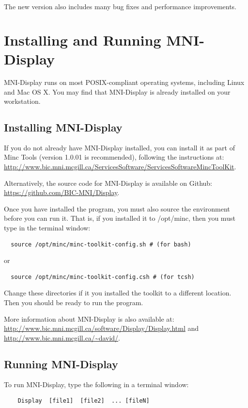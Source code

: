\documentclass[11pt,letterpaper]{article}
\newcommand{\display}{\mbox{MNI-Display}}
\begin{document}
The new version also includes many bug fixes and performance improvements.

\section{Installing and Running \display{}}

\display{} runs on most POSIX-compliant operating systems, including Linux
and Mac OS X. You may find that \display{} is already installed on your workstation.

\subsection{Installing \display{}}
If you do not already have \display{} installed, you can install it as
part of Minc Tools (version 1.0.01 is recommended), following the
instructions at:
\url{http://www.bic.mni.mcgill.ca/ServicesSoftware/ServicesSoftwareMincToolKit}.

Alternatively, the source code for MNI-Display is available on Github:
\url{https://github.com/BIC-MNI/Display}.

Once you have installed the program, you must also source the
environment before you can run it.  That is, if you installed it to
/opt/minc, then you must type in the terminal window:
\begin{verbatim}
  source /opt/minc/minc-toolkit-config.sh # (for bash)
\end{verbatim}
or
\begin{verbatim}
  source /opt/minc/minc-toolkit-config.csh # (for tcsh)
\end{verbatim}

Change these directories if it you installed the toolkit to a
different location. Then you should be ready to run the program.

More information about MNI-Display is also available at:
\url{http://www.bic.mni.mcgill.ca/software/Display/Display.html}
and
\url{http://www.bic.mni.mcgill.ca/~david/}.

\subsection{Running \display{}}

To run \display{}, type the following in a terminal window:

\begin{verbatim}
    Display  [file1]  [file2]  ... [fileN]
\end{verbatim}
\end{document}
